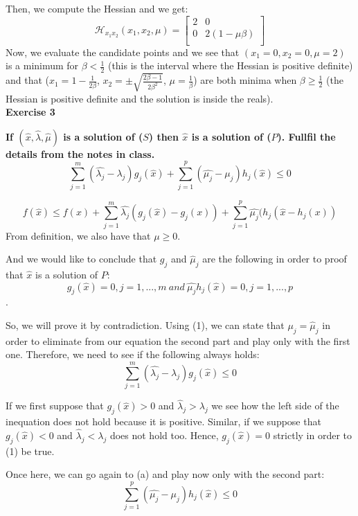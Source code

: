 \documentclass[12pt,letterpaper]{article}
\theoremstyle{definition}
\begin{document}
Then, we compute the Hessian and we get:
$$ \mathcal{H}_{x_1x_2} (x_1, x_2, \mu) = 
\begin{bmatrix}
    2 & 0 \\
    0 & 2(1-\mu \beta) \\
\end{bmatrix}
$$
Now, we evaluate the candidate points and we see that $(x_1=0, x_2=0, \mu = 2)$ is a minimum for $\beta < \frac{1}{2}$ (this is the interval where the Hessian is positive definite) and that ($x_1 = 1 -\frac{1}{2\beta}$, $x_2 =  \pm \sqrt{\frac{2\beta-1}{2\beta^2}}$,  $\mu = \frac{1}{\beta}$) are both minima when $\beta  \geq \frac{1}{2}$ (the Hessian is positive definite and the solution is inside the reals).
\\

\textbf{Exercise 3} 

\textbf{If $(\hat{x}, \hat{\lambda}, \hat{\mu})$ is a solution of ($S$) then $\hat{x}$ is a solution of ($P$). Fullfil the details from the notes in class.}
\begin{equation}
     \sum_{j=1}^{m} (\hat{\lambda_j}-\lambda_j)g_j(\hat{x}) + \sum_{j=1}^{p} (\hat{\mu_j}-\mu_j)h_j(\hat{x}) \leq 0
\end{equation}

\begin{equation}
     f(\hat{x}) \leq f(x) + \sum_{j=1}^{m} \hat{\lambda_j}(g_j(\hat{x}) - g_j(x)) + \sum_{j=1}^{p} \hat{\mu_j}(h_j(\hat{x} - h_j(x))
\end{equation}
From definition, we also have that $\mu \geq 0 $.

And we would like to conclude that $g_j$ and $\hat{\mu}_j$ are the following in order to proof that $\hat{x}$ is a solution of $P$:
$$g_j(\hat{x})=0, j=1,...,m \ and \ \hat{\mu_j}h_j(\hat{x})=0, j=1,...,p $$.

So, we will prove it by contradiction. Using (1), we can state that $\mu_j = \hat{\mu}_j$ in order to eliminate from our equation the second part and play only with the first one. Therefore, we need to see if the following always holds:
$$\sum_{j=1}^{m} (\hat{\lambda_j}-\lambda_j)g_j(\hat{x}) \leq 0$$

If we first suppose that $g_j(\hat{x})>0$ and $\hat{\lambda}_j > \lambda_j$ we see how the left side of the inequation does not hold because it is positive. Similar, if we suppose that $g_j(\hat{x})<0$ and $\hat{\lambda}_j < \lambda_j$ does not hold too. Hence, $g_j(\hat{x}) = 0$ strictly in order to (1) be true.

Once here, we can go again to (a) and play now only with the second part:
$$\sum_{j=1}^{p} (\hat{\mu_j}-\mu_j)h_j(\hat{x}) \leq 0$$
\end{document}
